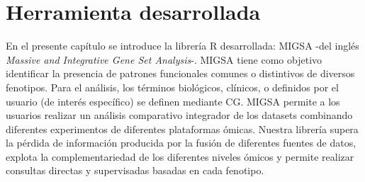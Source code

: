 \documentclass[12pt,twoside]{reedthesis}
\begin{document}
\hypertarget{herramienta-desarrollada}{%
\section{Herramienta desarrollada}\label{herramienta-desarrollada}}

\par

En el presente capítulo se introduce la librería R desarrollada: MIGSA -del inglés \emph{Massive and Integrative Gene Set Analysis}-. MIGSA tiene como objetivo identificar la presencia de patrones funcionales comunes o distintivos de diversos fenotipos. Para el análisis, los términos biológicos, clínicos, o definidos por el usuario (de interés específico) se definen mediante CG. MIGSA permite a los usuarios realizar un análisis comparativo integrador de los datasets combinando diferentes experimentos de diferentes plataformas ómicas. Nuestra librería supera la pérdida de información producida por la fusión de diferentes fuentes de datos, explota la complementariedad de los diferentes niveles ómicos y permite realizar consultas directas y supervisadas basadas en cada fenotipo.

\par
\end{document}
